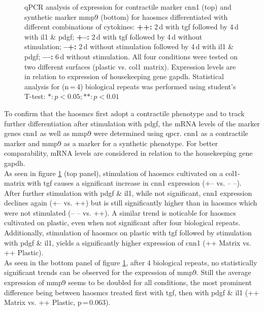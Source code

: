 \begin{figure}[h!]
    	\begin{minipage}{\captionwidth}
    		\caption[CNN_qPCR]{ \newline qPCR analysis of expression for contractile marker \ac{cnn1} (top) and synthetic marker \ac{mmp9} (bottom) for \acp{haosmc} differentiated with different combinations of cytokines:
            \textbf{++:} 2\,d with \ac{tgf} followed by 4\,d with \ac{il1} \& \ac{pdgf};
            \textbf{+–:} 2\,d with \ac{tgf} followed by 4\,d without stimulation;
            \textbf{–+:} 2\,d without stimulation followed by 4\,d with \ac{il1} \& \ac{pdgf};
            \textbf{––:} 6\,d without stimulation.
            All four conditions were tested on two different surfaces (plastic vs. \ac{col1} matrix). Expression levels are in relation to expression of housekeeping gene \ac{gapdh}. Statistical analysis for (n\,=\,4) biological repeats was performed using student's T-test: $*: p < 0.05; **: p < 0.01$}
    		\label{fig:qPCR}
    	\end{minipage}
    \end{figure}

    To confirm that the \acp{haosmc} first adopt a contractile phenotype and to track further differentiation after stimulation with \ac{pdgf}, the mRNA levels of the marker genes \ac{cnn1} as well as \ac{mmp9} were determined using \ac{qpcr}. \ac{cnn1} as a contractile marker and \ac{mmp9} as a marker for a synthetic phenotype. For better comparability, mRNA levels are considered in relation to the housekeeping gene \ac{gapdh}.\\
    As seen in figure \ref{fig:qPCR} (top panel), stimulation of \acp{haosmc} cultivated on a \ac{col1}-matrix with \ac{tgf} causes a significant increase in \ac{cnn1} expression (+– vs. – –). After further stimulation with \ac{pdgf} \& \ac{il1}, while not significant, \ac{cnn1} expression declines again (+– vs. ++) but is still significantly higher than in \acp{haosmc} which were not stimulated (– – vs. ++). A similar trend is noticable for \acp{haosmc} cultivated on plastic, even when not significant after four biological repeats. Additionally, stimulation of \acp{haosmc} on plastic with \ac{tgf} followed by stimulation with \ac{pdgf} \& \ac{il1}, yields a significantly higher expression of \ac{cnn1} (++ Matrix vs. ++ Plastic).\\
    As seen in the bottom panel of figure \ref{fig:qPCR}, after 4 biological repeats, no statistically significant trends can be observed for the expression of \ac{mmp9}. Still the average expression of \ac{mmp9} seems to be doubled for all conditions, the most prominent difference being between \acp{haosmc} treated first with \ac{tgf}, then with \ac{pdgf} \& \ac{il1} (++ Matrix vs. ++ Plastic, p\,=\,0.063).


